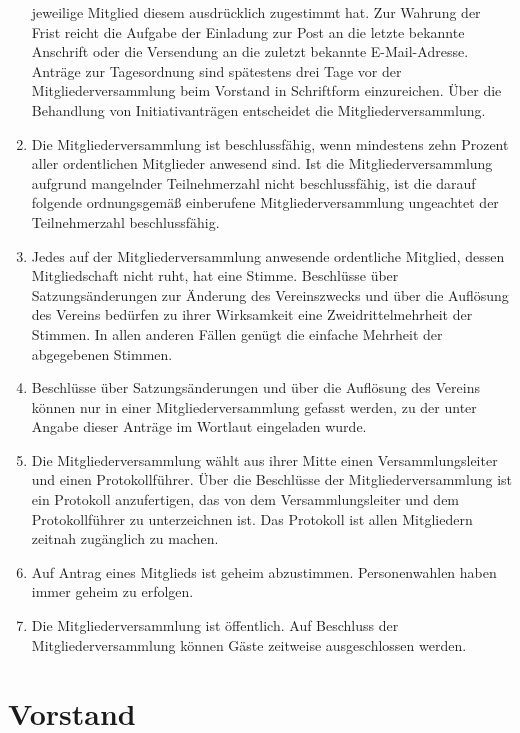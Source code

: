 \documentclass[10pt,a4paper]{scrartcl}
\begin{document}
\begin{enumerate}[label=(\arabic*)]
  jeweilige Mitglied diesem ausdrücklich zugestimmt hat. Zur Wahrung der Frist reicht
  die Aufgabe der Einladung zur Post an die letzte bekannte Anschrift oder die
  Versendung an die zuletzt bekannte E-Mail-Adresse. Anträge zur Tagesordnung sind
  spätestens drei Tage vor der Mitgliederversammlung beim Vorstand in Schriftform
  einzureichen. Über die Behandlung von Initiativanträgen entscheidet die
  Mitgliederversammlung.
\item
  Die Mitgliederversammlung ist beschlussfähig, wenn mindestens zehn Prozent aller
  ordentlichen Mitglieder anwesend sind. Ist die Mitgliederversammlung aufgrund
  mangelnder Teilnehmerzahl nicht beschlussfähig, ist die darauf folgende
  ordnungsgemäß einberufene Mitgliederversammlung ungeachtet der Teilnehmerzahl
  beschlussfähig.
\item
  Jedes auf der Mitgliederversammlung anwesende ordentliche Mitglied, dessen
  Mitgliedschaft nicht ruht, hat eine Stimme. Beschlüsse über Satzungsänderungen
  zur Änderung des Vereinszwecks und über die Auflösung des Vereins bedürfen zu
  ihrer Wirksamkeit eine Zweidrittelmehrheit der Stimmen. In allen anderen Fällen
  genügt die einfache Mehrheit der abgegebenen Stimmen.
\item
  Beschlüsse über Satzungsänderungen und über die Auflösung des Vereins können nur
  in einer Mitgliederversammlung gefasst werden, zu der unter Angabe dieser Anträge
  im Wortlaut eingeladen wurde.
\item
  Die Mitgliederversammlung wählt aus ihrer Mitte einen Versammlungsleiter und einen
  Protokollführer. Über die Beschlüsse der Mitgliederversammlung ist ein Protokoll
  anzufertigen, das von dem Versammlungsleiter und dem Protokollführer zu
  unterzeichnen ist. Das Protokoll ist allen Mitgliedern zeitnah zugänglich zu machen.
\item
  Auf Antrag eines Mitglieds ist geheim abzustimmen. Personenwahlen haben immer
  geheim zu erfolgen.
\item
  Die Mitgliederversammlung ist öffentlich. Auf Beschluss der Mitgliederversammlung
  können Gäste zeitweise ausgeschlossen werden.
\end{enumerate}


\section{Vorstand}
\end{document}
